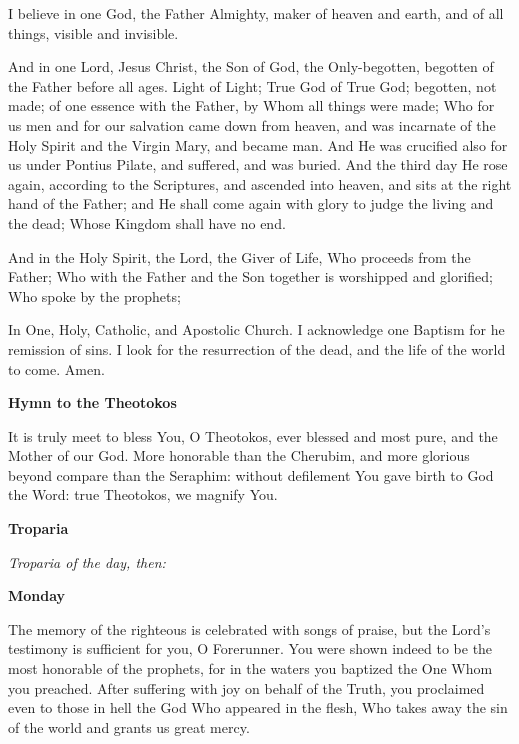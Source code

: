 \begin{hang}
\noindent{}I believe in one God, the Father Almighty, maker of heaven and earth, and of all things, visible and invisible.

And in one Lord, Jesus Christ, the Son of God, the Only-begotten, begotten of the Father before all ages.  Light of Light; True God of True God; begotten, not made; of one essence with the Father, by Whom all things were made; Who for us men and for our salvation came down from heaven, and was incarnate of the Holy Spirit and the Virgin Mary, and became man.  And He was crucified also for us under Pontius Pilate, and suffered, and was buried.  And the third day He rose again, according to the Scriptures, and ascended into heaven, and sits at the right hand of the Father; and He shall come again with glory to judge the living and the dead; Whose Kingdom shall have no end.

And in the Holy Spirit, the Lord, the Giver of Life, Who proceeds from the 
Father; Who with the Father and the Son together is worshipped and glorified; 
Who spoke by the prophets;

In One, Holy, Catholic, and Apostolic Church.  I acknowledge one Baptism for he 
remission of sins.  I look for the resurrection of the dead, and the life of 
the world to come.  Amen.

\end{hang}

\begin{center}
\textbf{Hymn to the Theotokos}
\end{center}

\begin{hang}
\noindent{}It is truly meet to bless You, O Theotokos, ever blessed and most pure, and the Mother of our God.  More honorable than the Cherubim, and more glorious beyond compare than the Seraphim: without defilement You gave birth to God the Word: true Theotokos, we magnify You.

\end{hang}

\begin{center}
\textbf{Troparia}
\end{center}

\noindent
\textit{Troparia of the day, then:}
 
\begin{center}
\textbf{Monday}
\end{center}

\begin{hang}
\noindent{}The memory of the righteous is celebrated with songs of praise, but the Lord's testimony is sufficient for you, O Forerunner.  You were shown indeed to be the most honorable of the prophets, for in the waters you baptized the One Whom you preached.  After suffering with  joy on behalf of the Truth, you proclaimed even to those in hell the God Who appeared in the flesh, Who takes away the sin of the world and grants us great mercy.

\end{hang}


